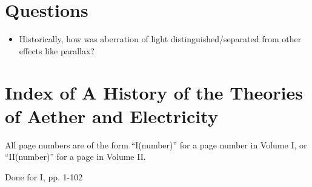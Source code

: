 \documentclass[a4paper]{article}
\theoremstyle{plain}
\theoremstyle{definition}
\begin{document}
\section{Questions}

\begin{itemize}
\item Historically, how was aberration of light
  distinguished/separated from other effects like parallax?
\end{itemize}


\section{Index of A History of the Theories of Aether and Electricity}

All page numbers are of the form ``I(number)'' for a page number in
Volume I, or ``II(number)'' for a page in Volume II.

Done for I, pp. 1-102
\end{document}
